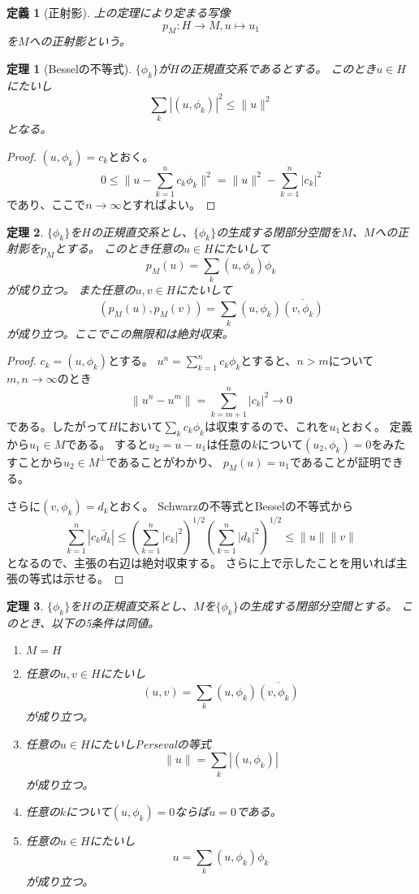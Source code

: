 \documentclass{jsarticle}
\newtheorem{dfn}{定義}
\newtheorem{thm}{定理}
\newcommand{\abs}[1]{|#1|}
\newcommand{\norm}[1]{\|#1\|}
\begin{document}
\begin{dfn}[正射影]
上の定理により定まる写像
\[
p_M\colon H\to M, u\mapsto u_1
\]
を$M$への正射影という。
\end{dfn}

\begin{thm}[Besselの不等式]
$\{\phi_k\}$が$H$の正規直交系であるとする。
このとき$u\in H$にたいし
\[
\sum_k\abs{(u,\phi_k)}^2\leq \norm{u}^2
\]
となる。
\end{thm}
\begin{proof}
$(u,\phi_k)=c_k$とおく。
\[
0\leq\norm{u-\sum^n_{k=1}c_k\phi_k}^2=\norm{u}^2-\sum^n_{k=1}\abs{c_k}^2
\]
であり、ここで$n\to\infty$とすればよい。
\end{proof}

\begin{thm}
$\{\phi_k\}$を$H$の正規直交系とし、$\{\phi_k\}$の生成する閉部分空間を$M$、$M$への正射影を$p_M$とする。
このとき任意の$u\in H$にたいして
\[
p_M(u)=\sum_k(u,\phi_k)\phi_k
\]
が成り立つ。
また任意の$u,v\in H$にたいして
\[
(p_M(u),p_M(v))=\sum_k(u,\phi_k)\overline{(v,\phi_k)}
\]
が成り立つ。ここでこの無限和は絶対収束。
\end{thm}
\begin{proof}
$c_k=(u,\phi_k)$とする。
$u^n=\sum^n_{k=1}c_k\phi_k$とすると、$n>m$について$m,n\to \infty$のとき
\[
\norm{u^n-u^m}=\sum^n_{k=m+1}\abs{c_k}^2\to0
\]
である。したがって$H$において$\sum_kc_k\phi_k$は収束するので、これを$u_1$とおく。
定義から$u_1\in M$である。
すると$u_2=u-u_1$は任意の$k$について$(u_2,\phi_k)=0$をみたすことから$u_2\in M^\perp$であることがわかり、
$p_M(u)=u_1$であることが証明できる。

さらに$(v,\phi_k)=d_k$とおく。
Schwarzの不等式とBesselの不等式から
\[
\sum_{k=1}^n\abs{c_k\bar{d}_k}\leq(\sum_{k=1}^n\abs{c_k}^2)^{1/2}(\sum_{k=1}^n\abs{d_k}^2)^{1/2}\leq\norm{u}\norm{v}
\]
となるので、主張の右辺は絶対収束する。
さらに上で示したことを用いれば主張の等式は示せる。
\end{proof}

\begin{thm}
$\{\phi_k\}$を$H$の正規直交系とし、$M$を$\{\phi_k\}$の生成する閉部分空間とする。
このとき、以下の5条件は同値。
\begin{enumerate}
\item $M=H$
\item 任意の$u, v\in H$にたいし
\[
(u,v)=\sum_k(u,\phi_k)\overline{(v,\phi_k)}
\]
が成り立つ。
\item 任意の$u\in H$にたいしPersevalの等式
\[
\norm{u}=\sum_k\abs{(u,\phi_k)}
\]
が成り立つ。
\item 任意の$k$について$(u,\phi_k)=0$ならば$u=0$である。
\item 任意の$u\in H$にたいし
\[
u=\sum_k(u,\phi_k)\phi_k
\]
が成り立つ。
\end{enumerate}
\end{thm}
\end{document}
